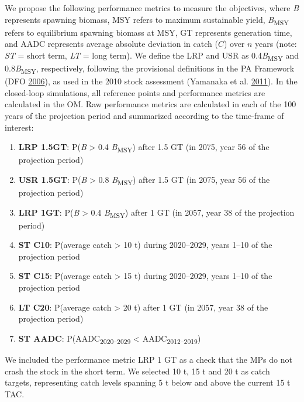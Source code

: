 \documentclass[11pt]{book}
\begin{document}
We propose the following performance metrics to measure the objectives, where \emph{B} represents spawning biomass, MSY refers to maximum sustainable yield, \emph{B}\textsubscript{MSY} refers to equilibrium spawning biomass at MSY, GT represents generation time, and AADC represents average absolute deviation in catch (\(C\)) over \(n\) years (note: \emph{ST} = short term, \emph{LT} = long term). We define the LRP and USR as 0.4\emph{B}\textsubscript{MSY} and 0.8\emph{B}\textsubscript{MSY}, respectively, following the provisional definitions in the PA Framework (DFO \protect\hyperlink{ref-dfo2006}{2006}), as used in the 2010 stock assessment (Yamanaka et al. \protect\hyperlink{ref-yamanaka2011}{2011}). In the closed-loop simulations, all reference points and performance metrics are calculated in the OM. Raw performance metrics are calculated in each of the 100 years of the projection period and summarized according to the time-frame of interest:
\begin{enumerate}
\def\labelenumi{\arabic{enumi}.}

\item
  \textbf{LRP 1.5GT}: P(\emph{B} \textgreater{} 0.4 \emph{B}\textsubscript{MSY}) after 1.5 GT (in 2075, year 56 of the projection period)
\item
  \textbf{USR 1.5GT}: P(\emph{B} \textgreater{} 0.8 \emph{B}\textsubscript{MSY}) after 1.5 GT (in 2075, year 56 of the projection period)
\item
  \textbf{LRP 1GT}: P(\emph{B} \textgreater{} 0.4 \emph{B}\textsubscript{MSY}) after 1 GT (in 2057, year 38 of the projection period)
\item
  \textbf{ST C10}: P(average catch \textgreater{} 10 t) during 2020--2029, years 1--10 of the projection period\\
\item
  \textbf{ST C15}: P(average catch \textgreater{} 15 t) during 2020--2029, years 1--10 of the projection period 
\item
  \textbf{LT C20}: P(average catch \textgreater{} 20 t) after 1 GT (in 2057, year 38 of the projection period)
\item
  \textbf{ST AADC}: P(AADC\textsubscript{2020--2029} \textless{} AADC\textsubscript{2012--2019})
\end{enumerate}
We included the performance metric LRP 1 GT as a check that the MPs do not crash the stock in the short term. We selected 10 t, 15 t and 20 t as catch targets, representing catch levels spanning 5 t below and above the current 15 t TAC.
\end{document}

